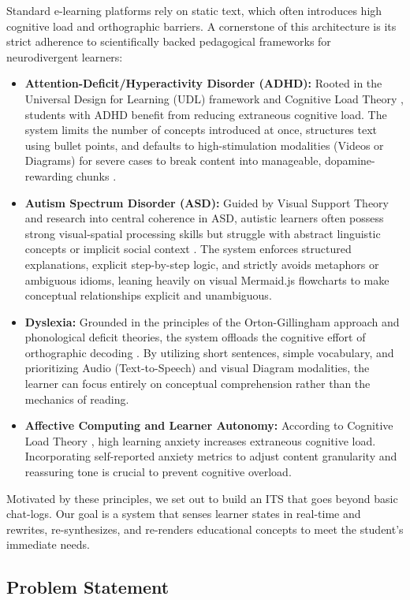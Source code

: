 \documentclass[final,5p,times,twocolumn,authoryear]{elsarticle}
\begin{document}
Standard e-learning platforms rely on static text, which often introduces high cognitive load and orthographic barriers. A cornerstone of this architecture is its strict adherence to scientifically backed pedagogical frameworks for neurodivergent learners:
\begin{itemize}
    \item \textbf{Attention-Deficit/Hyperactivity Disorder (ADHD):} Rooted in the Universal Design for Learning (UDL) framework and Cognitive Load Theory \cite{2}, students with ADHD benefit from reducing extraneous cognitive load. The system limits the number of concepts introduced at once, structures text using bullet points, and defaults to high-stimulation modalities (Videos or Diagrams) for severe cases to break content into manageable, dopamine-rewarding chunks \cite{15}.
    \item \textbf{Autism Spectrum Disorder (ASD):} Guided by Visual Support Theory and research into central coherence in ASD, autistic learners often possess strong visual-spatial processing skills but struggle with abstract linguistic concepts or implicit social context \cite{13, 16}. The system enforces structured explanations, explicit step-by-step logic, and strictly avoids metaphors or ambiguous idioms, leaning heavily on visual Mermaid.js flowcharts to make conceptual relationships explicit and unambiguous.
    \item \textbf{Dyslexia:} Grounded in the principles of the Orton-Gillingham approach and phonological deficit theories, the system offloads the cognitive effort of orthographic decoding \cite{15, 16}. By utilizing short sentences, simple vocabulary, and prioritizing Audio (Text-to-Speech) and visual Diagram modalities, the learner can focus entirely on conceptual comprehension rather than the mechanics of reading.
    \item \textbf{Affective Computing and Learner Autonomy:} According to Cognitive Load Theory \cite{2}, high learning anxiety increases extraneous cognitive load. Incorporating self-reported anxiety metrics to adjust content granularity and reassuring tone is crucial to prevent cognitive overload.
\end{itemize}
Motivated by these principles, we set out to build an ITS that goes beyond basic chat-logs. Our goal is a system that senses learner states in real-time and rewrites, re-synthesizes, and re-renders educational concepts to meet the student's immediate needs.

\subsection{Problem Statement}
\label{subsec:problem_statement}
\end{document}
